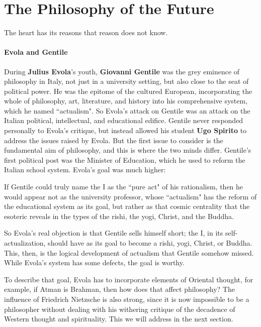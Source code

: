 \section{The Philosophy of the Future}

\begin{quotex}
The heart has its reasons that reason does not know. 

\end{quotex}
\paragraph{Evola and Gentile}
During \textbf{Julius Evola}'s youth, \textbf{Giovanni Gentile} was the grey eminence of philosophy in Italy, not just in a university setting, but also close to the seat of political power. He was the epitome of the cultured European, incorporating the whole of philosophy, art, literature, and history into his comprehensive system, which he named ``actualism". So Evola's attack on Gentile was an attack on the Italian political, intellectual, and educational edifice. Gentile never responded personally to Evola's critique, but instead allowed his student \textbf{Ugo Spirito} to address the issues raised by Evola. But the first issue to consider is the fundamental aim of philosophy, and this is where the two minds differ. Gentile's first political post was the Minister of Education, which he used to reform the Italian school system. Evola's goal was much higher:

\begin{quotex}
If Gentile could truly name the I as the ``pure act" of his rationalism, then he would appear not as the university professor, whose ``actualism" has the reform of the educational system as its goal, but rather as that cosmic centrality that the esoteric reveals in the types of the rishi, the yogi, Christ, and the Buddha. 

\end{quotex}
So Evola's real objection is that Gentile sells himself short; the I, in its self-actualization, should have as its goal to become a rishi, yogi, Christ, or Buddha. This, then, is the logical development of actualism that Gentile somehow missed. While Evola's system has some defects, the goal is worthy.

To describe that goal, Evola has to incorporate elements of Oriental thought, for example, if Atman is Brahman, then how does that affect philosophy? The influence of Friedrich Nietzsche is also strong, since it is now impossible to be a philosopher without dealing with his withering critique of the decadence of Western thought and spirituality. This we will address in the next section.

